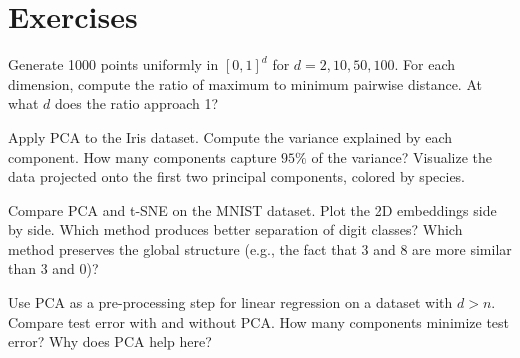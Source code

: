 \section{Exercises}

\begin{exercise}
	Generate 1000 points uniformly in $[0, 1]^d$ for $d = 2, 10, 50, 100$. For each dimension, compute the ratio of maximum to minimum pairwise distance. At what $d$ does the ratio approach 1?
\end{exercise}

\begin{exercise}
	Apply PCA to the Iris dataset. Compute the variance explained by each component. How many components capture $95\%$ of the variance? Visualize the data projected onto the first two principal components, colored by species.
\end{exercise}

\begin{exercise}
	Compare PCA and t-SNE on the MNIST dataset. Plot the 2D embeddings side by side. Which method produces better separation of digit classes? Which method preserves the global structure (e.g., the fact that 3 and 8 are more similar than 3 and 0)?
\end{exercise}

\begin{exercise}
	Use PCA as a pre-processing step for linear regression on a dataset with $d > n$. Compare test error with and without PCA. How many components minimize test error? Why does PCA help here?
\end{exercise}
